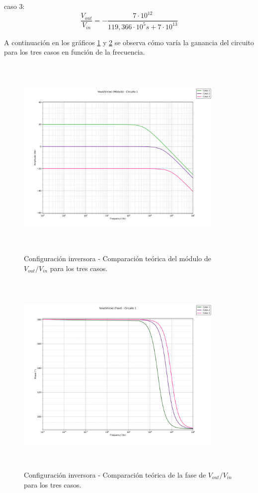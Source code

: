 caso 3:
\begin{equation}
	\frac{V_{out}}{V_{in}} = - \frac{7 \cdot 10^{12}}{119,366 \cdot 10^{5} s +7 \cdot 10^{13}}
	\label{c1c3vovi}
\end{equation}

A continuaci\'on en los gr\'aficos \ref{c1voviTeoMod} y \ref{c1voviTeoPh} se observa c\'omo var\'ia la ganancia del circuito para los tres casos en funci\'on de la frecuencia.

\begin{figure}[H] %
	\centering
	\includegraphics[width=10cm,height=10cm,keepaspectratio]{../EJ1/00GRAFICOS/teoricos/circ1voviw.png}
	\caption{Configuración inversora - Comparaci\'on te\'orica del m\'odulo de $V_{out}/V_{in}$ para los tres casos.}
	\label{c1voviTeoMod}
\end{figure}

\begin{figure}[H] %
	\centering
	\includegraphics[width=10cm,height=10cm,keepaspectratio]{../EJ1/00GRAFICOS/teoricos/circ1vovifasew.png}
	\caption{Configuración inversora - Comparaci\'on te\'orica de la fase de $V_{out}/V_{in}$ para los tres casos.}
	\label{c1voviTeoPh}
\end{figure}


